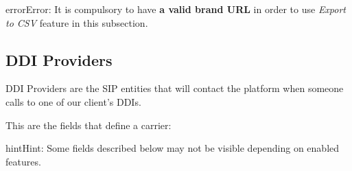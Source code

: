 \documentclass[letterpaper,10pt,english]{sphinxmanual}
\begin{document}
\begin{notice}{error}{Error:}
It is compulsory to have \textbf{a valid brand URL} in order to use \emph{Export to CSV} feature in this subsection.
\end{notice}


\subsection{DDI Providers}
\label{administration_portal/brand/providers/ddi_providers:ddi-providers}\label{administration_portal/brand/providers/ddi_providers::doc}
DDI Providers are the SIP entities that will contact the platform when someone calls to one of our client's DDIs.

This are the fields that define a carrier:

\begin{notice}{hint}{Hint:}
Some fields described below may not be visible depending on enabled features.
\end{notice}
\end{document}
